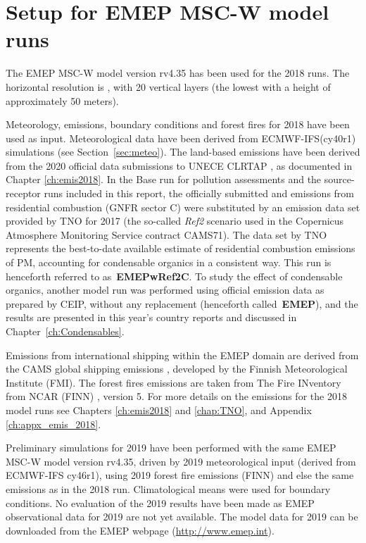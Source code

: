 \section{Setup for EMEP MSC-W model runs}
\label{Mod_2018}

The EMEP MSC-W model version rv4.35 has been used for the 2018
runs. The horizontal resolution is \resZO, with 20 vertical layers
(the lowest with a height of approximately 50 meters).

 Meteorology, emissions, boundary conditions and forest fires for 2018 have been
 used as input. Meteorological data have been
 derived from ECMWF-IFS(cy40r1) simulations (see Section~\ref{sec:meteo}). The
 land-based emissions have been derived from the 2020 official data
 submissions to UNECE CLRTAP \citep{CEIP2020}, as documented in
 Chapter \ref{ch:emis2018}. In the Base run for pollution assessments and the source-receptor runs included in this report, the officially submitted \PM[10] and \PM[2.5] emissions from residential combustion (GNFR sector C) were substituted by an emission data set provided by TNO for 2017 (the so-called \textit{Ref2} scenario used in the Copernicus Atmosphere Monitoring Service contract CAMS71). The data set by TNO represents the best-to-date available estimate of residential combustion emissions of PM, accounting for condensable organics in a consistent way. This run is henceforth referred to as~\textbf{EMEPwRef2C}. To study the effect of condensable organics, another model run was performed using official emission data as prepared by CEIP, without any replacement (henceforth called~\textbf{EMEP}), and the results are presented in this year's country reports \citep{Klein:2020} and discussed in Chapter~\ref{ch:Condensables}.
 
 Emissions from international shipping
 within the EMEP domain are derived from the CAMS global shipping
 emissions \citep{CAMSemis2019}, developed by the Finnish
 Meteorological Institute (FMI). The forest fires emissions are taken from
 The Fire INventory from NCAR (FINN) \citep{FINNIGAN1990}, version 5.
 For more details on the emissions for the 2018 model runs see Chapters
 \ref{ch:emis2018} and \ref{chap:TNO}, and Appendix \ref{ch:appx_emis_2018}.

 Preliminary simulations for 2019 have been performed with the same
 EMEP MSC-W model version rv4.35, driven by 2019 meteorological
 input (derived from ECMWF-IFS cy46r1), using 2019 forest fire emissions (FINN)
 and else the same emissions as in the 2018 run. Climatological
 means were used for boundary conditions. No evaluation of the 2019
 results have been made as EMEP observational data for 2019 are not yet
 available. The model data for 2019 can be downloaded from the EMEP
 webpage (\url{http://www.emep.int}).

